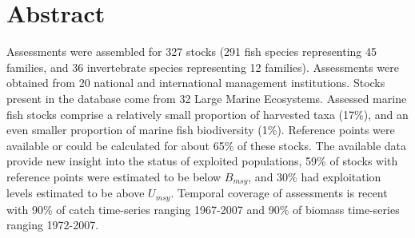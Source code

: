 \section*{Abstract}

Assessments were assembled for 327 stocks
(291 fish species representing
45 families, and 36
invertebrate species representing 12
families). Assessments were obtained from 20 national
and international management institutions. Stocks
present in the database come from 32 Large
Marine Ecosystems. Assessed marine fish stocks
comprise a relatively small proportion of harvested taxa
(17\%), and an even smaller proportion of
marine fish biodiversity (1\%). Reference
points were available or could be calculated for about
65\% of these stocks. The available data
provide new insight into the status of exploited populations,
59\% of stocks with reference points
were estimated to be below $B_{msy}$, and
30\% had exploitation levels
estimated to be above $U_{msy}$. Temporal coverage of assessments is
recent with 90\% of catch time-series ranging 1967-2007
and 90\% of biomass time-series ranging 1972-2007.


